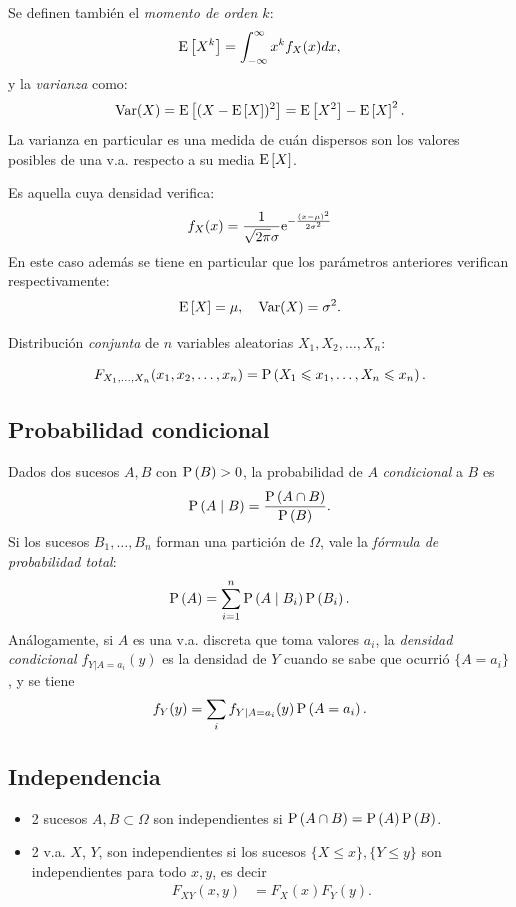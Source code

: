 Se definen también el \emph{momento de orden $k$}:
\[\mathrm{E}\left[X^k\right]=\int_{-\infty}^\infty x^kf_X(x) dx, \]
y la \emph{varianza} como:
\[\operatorname{Var}(X)=\mathrm{E}\left[(X-\mathrm{E}\left[X\right])^2\right] = \mathrm{E}\left[X^2\right]-\mathrm{E}\left[X\right]^2.\]
La varianza en particular es una medida de cuán dispersos son los valores posibles de una v.a. respecto a su media $\mathrm{E}\left[X\right]$.

\begin{ejemplo}
    Es aquella cuya densidad verifica:
    \[f_X(x)=\frac{1}{\sqrt{2\pi}\sigma}\mathrm{e}^{-\frac{(x-\mu)^2}{2\sigma^2}}\]
    En este caso además se tiene en particular que los parámetros anteriores verifican respectivamente:
    \[\mathrm{E}\left[X\right]=\mu, \quad \operatorname{Var}(X)=\sigma^2.\]
\end{ejemplo}

Distribución \emph{conjunta} de $n$ variables aleatorias $X_1,
X_2,\ldots, X_n$:

\[F_{X_1,\ldots,X_n}(x_1,x_2,\ldots,x_n)=\mathrm{P}\left(X_1\leqslant x_1,\ldots, X_n\leqslant x_n\right).\]

\subsection*{Probabilidad condicional}

Dados dos sucesos $A,B$ con $\mathrm{P}\left(B\right)>0$, la probabilidad de $A$ \emph{condicional} a $B$ es
\[\mathrm{P}\left(A\mid B\right) = \frac{\mathrm{P}\left(A\cap B\right)}{\mathrm{P}\left(B\right)}.\]
Si los sucesos $B_1,\ldots,B_n$ forman una partición de $\Omega$, vale la \emph{fórmula de probabilidad total}:
\[\mathrm{P}\left(A\right) = \sum_{i=1}^n \mathrm{P}\left(A\mid B_i\right)\mathrm{P}\left(B_i\right).\]
Análogamente, si $A$ es una v.a. discreta que toma valores $a_i$, la \emph{densidad condicional} $f_{Y|A=a_i}(y)$ es la densidad de $Y$ cuando se sabe que ocurrió $\{A=a_i\}$, y se tiene
\[f_Y(y) = \sum_i f_{Y|A=a_i}(y)\,\mathrm{P}\left(A=a_i\right).\]

\subsection*{Independencia}

\begin{itemize}
    \item 2 sucesos $A,B\subset\Omega$ son independientes si $\mathrm{P}\left(A\cap
    B\right)=\mathrm{P}\left(A\right)\mathrm{P}\left(B\right)$.
    \item 2 v.a. $X$, $Y$, son independientes si los sucesos $\{X\leqslant x\}, \{Y\leqslant y\}$
    son independientes para todo $x, y$, es decir
    \begin{align*}
                                            F_{XY}(x,y) & = F_X(x)
                                            F_Y(y).
                                        \end{align*}
\end{itemize}

